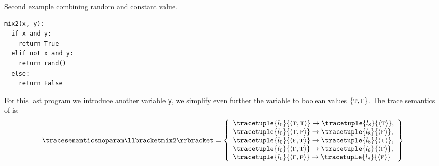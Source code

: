 \begin{example}
  \begin{marginlisting}
    \caption{Second example combining random and constant value.}
    \vspace{25pt}
  \begin{lstlisting}[style=mystyle,language=customPython]
mix2(x, y):
  if x and y:
    return True
  elif not x and y:
    return rand()
  else:
    return False
 \end{lstlisting}
  \end{marginlisting}
  For this last program we introduce another variable \texttt{y}, we simplify even further the variable to boolean values $\{\textsc{t}, \textsc{f}\}$.
  The trace semantics of  is:
  \begin{align*}
    \tracesemanticsnoparam\semanticsof{\texttt{mix2}}
    =
    \left\{
      \begin{array}{l}
        \tracetuple{\locinit}{\langle \true, \true\rangle}\rightarrow\tracetuple{\loc{8}}{\langle \true\rangle}, \\
        \tracetuple{\locinit}{\langle \true, \false\rangle}\rightarrow\tracetuple{\loc{8}}{\langle \false\rangle}, \\
        \tracetuple{\locinit}{\langle \false, \true\rangle}\rightarrow\tracetuple{\loc{8}}{\langle \true\rangle}, \\
        \tracetuple{\locinit}{\langle \false, \true\rangle}\rightarrow\tracetuple{\loc{8}}{\langle \false\rangle}, \\
        \tracetuple{\locinit}{\langle \false, \false\rangle}\rightarrow\tracetuple{\loc{8}}{\langle \false\rangle}
      \end{array}
      \right\}
  \end{align*}
  \begin{marginfigure}
\end{marginfigure}
\end{example}

